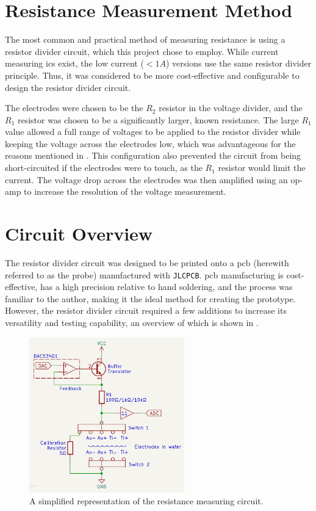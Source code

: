 \section{Resistance Measurement Method}

The most common and practical method of measuring resistance is using a resistor divider circuit, which this project chose to employ. 
While current measuring \glspl{ic} exist, the low current ($<1A$) versions use the same resistor divider principle. 
Thus, it was considered to be more cost-effective and configurable to design the resistor divider circuit.

The electrodes were chosen to be the $R_2$ resistor in the voltage divider, and the $R_1$ resistor was chosen to be a significantly larger, known resistance.
The large $R_1$ value allowed a full range of voltages to be applied to the resistor divider while keeping the voltage across the electrodes low, which was advantageous for the reasons mentioned in .
This configuration also prevented the circuit from being short-circuited if the electrodes were to touch, as the $R_1$ resistor would limit the current.
The voltage drop across the electrodes was then amplified using an op-amp to increase the resolution of the voltage measurement.

\section{Circuit Overview}

The resistor divider circuit was designed to be printed onto a \gls{pcb} (herewith referred to as the probe) manufactured with \texttt{JLCPCB}.
\gls{pcb} manufacturing is cost-effective, has a high precision relative to hand soldering, and the process was familiar to the author, making it the ideal method for creating the prototype.
However, the resistor divider circuit required a few additions to increase its versatility and testing capability, an overview of which is shown in .

\begin{figure}[ht]
    \centering
    \includegraphics[width=0.6\textwidth]{Figures/CircuitOverview}
    \caption{A simplified representation of the resistance measuring circuit.}
    \label{fig:circuit-overview} %
\end{figure}


